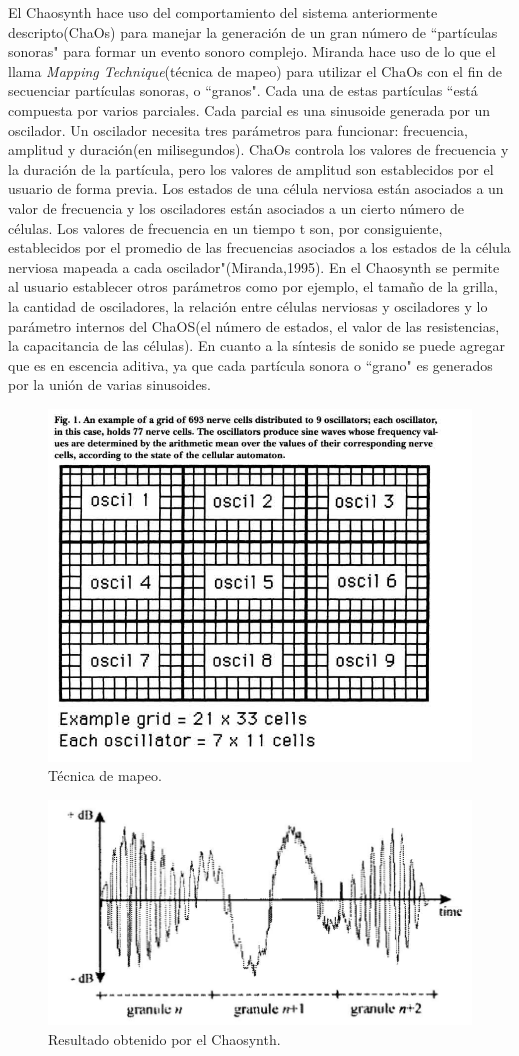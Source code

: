 \documentclass[16pt,spanish]{article}
\begin{document}
El Chaosynth hace uso del comportamiento del sistema anteriormente
descripto(ChaOs) para manejar la generación de un gran número de ``partículas
sonoras" para formar un evento sonoro complejo. Miranda hace uso de lo que el
llama \textit{Mapping Technique}(técnica de mapeo) para utilizar el ChaOs con
el fin de secuenciar partículas sonoras, o ``granos". Cada una de estas
partículas  ``está compuesta por varios parciales. Cada parcial es una
sinusoide generada por un oscilador. Un oscilador necesita tres parámetros para
funcionar: frecuencia, amplitud y duración(en milisegundos). ChaOs controla los
valores de frecuencia y la duración de la partícula, pero los valores de
amplitud son establecidos por el usuario de forma previa. Los estados de una
célula nerviosa están asociados a un valor de frecuencia y los osciladores
están asociados a un cierto número de células. Los valores de frecuencia en un
tiempo t son, por consiguiente, establecidos por el promedio de las frecuencias
asociados a los estados de la célula nerviosa mapeada a cada
oscilador"(Miranda,1995). En el Chaosynth se permite al usuario establecer
otros parámetros como por ejemplo, el tamaño de la grilla, la cantidad de
osciladores, la relación entre células nerviosas y osciladores y lo parámetro
internos del ChaOS(el número de estados, el valor de las resistencias, la
capacitancia de las células). En cuanto a la síntesis de sonido se puede
agregar que es en escencia aditiva, ya que cada partícula sonora o ``grano" es
generados por la unión de varias sinusoides.


\begin{figure}[ht]
\centering
\includegraphics[width=0.5\linewidth, bb = 0 0 673 560]{imagesCA/mapping_technique.jpg}
\caption{Técnica de mapeo.~\cite{miranda1995granular}}
\end{figure}

\begin{figure}[ht]
\centering
\includegraphics[width=0.5\linewidth, bb = 0 0 860 457]{imagesCA/Granular_output.jpg}
\caption{Resultado obtenido por el Chaosynth.~\cite{miranda1995granular}}
\end{figure}
\end{document}
